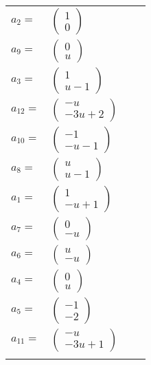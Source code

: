 \documentclass[1p]{elsarticle_modified}
\theoremstyle{definition}
\begin{document}
\begin{tabular}{m{7pt} m{180pt} m{7pt} m{180pt} }
\flushright $a_{2}=$&$\begin{pmatrix}1\\0\end{pmatrix}$ \\
\flushright $a_{9}=$&$\begin{pmatrix}0\\u\end{pmatrix}$ \\
\flushright $a_{3}=$&$\begin{pmatrix}1\\u-1\end{pmatrix}$ \\
\flushright $a_{12}=$&$\begin{pmatrix}- u\\-3 u+2\end{pmatrix}$ \\
\flushright $a_{10}=$&$\begin{pmatrix}-1\\- u-1\end{pmatrix}$ \\
\flushright $a_{8}=$&$\begin{pmatrix}u\\u-1\end{pmatrix}$ \\
\flushright $a_{1}=$&$\begin{pmatrix}1\\- u+1\end{pmatrix}$ \\
\flushright $a_{7}=$&$\begin{pmatrix}0\\- u\end{pmatrix}$ \\
\flushright $a_{6}=$&$\begin{pmatrix}u\\- u\end{pmatrix}$ \\
\flushright $a_{4}=$&$\begin{pmatrix}0\\u\end{pmatrix}$ \\
\flushright $a_{5}=$&$\begin{pmatrix}-1\\-2\end{pmatrix}$ \\
\flushright $a_{11}=$&$\begin{pmatrix}- u\\-3 u+1\end{pmatrix}$\\&\end{tabular}
\end{document}
